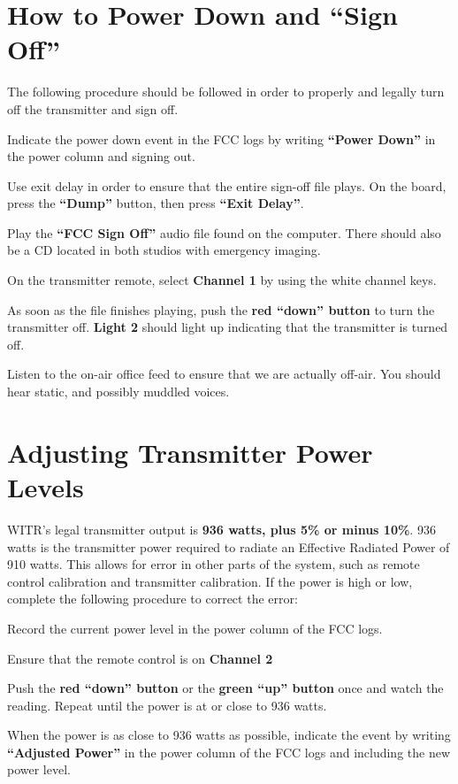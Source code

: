 \documentclass{witrman}
\begin{document}
\section{How to Power Down and ``Sign Off''}
The following procedure should be followed in order to properly and legally turn
off the transmitter and sign off.
\begin{skinnyenumerate}
    \item Indicate the power down event in the FCC logs by writing
        \textbf{``Power Down''} in the power column and signing out.
    \item Use exit delay in order to ensure that the entire sign-off file plays.
        On the board, press the \textbf{``Dump''} button, then press
        \textbf{``Exit Delay''}.
    \item Play the \textbf{``FCC Sign Off''} audio file found on the computer.
        There should also be a CD located in both studios with emergency
        imaging.
    \item On the transmitter remote, select \textbf{Channel 1} by using the
        white channel keys.
    \item As soon as the file finishes playing, push the \textbf{red ``down''
        button} to turn the transmitter off. \textbf{Light 2} should light up
        indicating that the transmitter is turned off.
    \item Listen to the on-air office feed to ensure that we are actually
        off-air. You should hear static, and possibly muddled voices.
\end{skinnyenumerate}

\section{Adjusting Transmitter Power Levels}
WITR’s legal transmitter output is \textbf{936 watts, plus 5\% or minus 10\%}.
936 watts is the transmitter power required to radiate an Effective Radiated
Power of 910 watts. This allows for error in other parts of the system, such as
remote control calibration and transmitter calibration. If the power is high or
low, complete the following procedure to correct the error:
\begin{skinnyenumerate}
    \item Record the current power level in the power column of the FCC logs.
    \item Ensure that the remote control is on \textbf{Channel 2}
    \item Push the \textbf{red ``down'' button} or the \textbf{green ``up''
        button} once and watch the reading. Repeat until the power is at or
        close to 936 watts.
    \item When the power is as close to 936 watts as possible, indicate the
        event by writing \textbf{``Adjusted Power''} in the power column of the
        FCC logs and including the new power level.
\end{skinnyenumerate}
\end{document}
